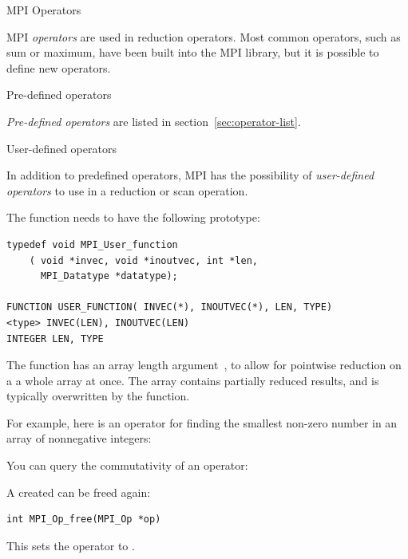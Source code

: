 
 {MPI Operators}

MPI \emph{operators} are used in reduction operators. Most common
operators, such as sum or maximum, have been built into the MPI
library, but it is possible to define new operators.

 {Pre-defined operators}

\emph{Pre-defined operators}
are listed in section~\ref{sec:operator-list}.

 {User-defined operators}

In addition to predefined operators, MPI has the possibility of
\emph{user-defined operators}
to use in a reduction or scan operation.


The function needs to have the following prototype:

\begin{verbatim}
typedef void MPI_User_function
    ( void *invec, void *inoutvec, int *len, 
      MPI_Datatype *datatype); 

FUNCTION USER_FUNCTION( INVEC(*), INOUTVEC(*), LEN, TYPE) 
<type> INVEC(LEN), INOUTVEC(LEN) 
INTEGER LEN, TYPE 
\end{verbatim}

The function has an array length argument~, to allow for
pointwise reduction on a a whole array at once. The  array
contains partially reduced results, and is typically overwritten by
the function.

For example, here is an operator for finding the smallest non-zero
number in an array of nonnegative integers:
%

You can query the commutativity of an operator:
%

A created  can be freed again:
%
\begin{lstlisting}
int MPI_Op_free(MPI_Op *op)
\end{lstlisting}
%
This sets the operator to .

